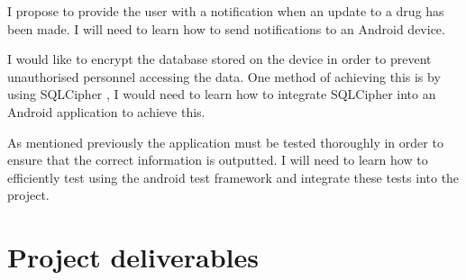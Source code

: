 \documentclass[11pt,fleqn,twoside]{article}
\begin{document}
I propose to provide the user with a notification \cite{AndroidNotification} when an update to a drug has been made. I will need to learn how to send notifications to an Android device.

I would like to encrypt the database stored on the device in order to prevent unauthorised personnel accessing the data. One method of achieving this is by using SQLCipher \cite{SQLCipher}, I would need to learn how to integrate SQLCipher into an Android application to achieve this.

 As mentioned previously the application must be tested thoroughly in order to ensure that the correct information is outputted. I will need to learn how to efficiently test using the android test framework \cite{AndroidTesting} and integrate these tests into the project.



\section{Project deliverables}
\end{document}
